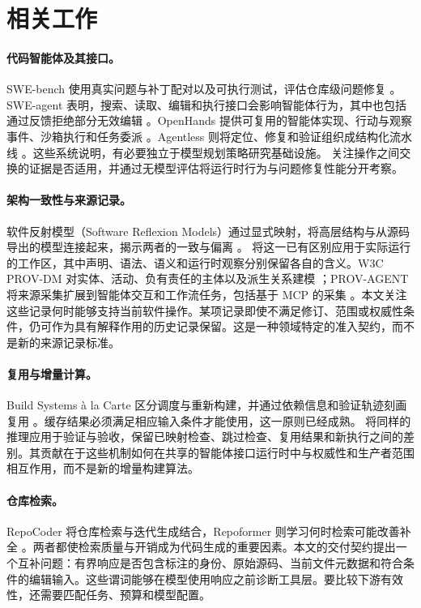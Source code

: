 \section{相关工作}
\label{sec:related}
\paragraph{代码智能体及其接口。}
SWE-bench 使用真实问题与补丁配对以及可执行测试，评估仓库级问题修复 \cite{jimenez2024swebench}。SWE-agent 表明，搜索、读取、编辑和执行接口会影响智能体行为，其中也包括通过反馈拒绝部分无效编辑 \cite{yang2024sweagent}。OpenHands 提供可复用的智能体实现、行动与观察事件、沙箱执行和任务委派 \cite{wang2025openhands}。Agentless 则将定位、修复和验证组织成结构化流水线 \cite{xia2025agentless}。这些系统说明，有必要独立于模型规划策略研究基础设施。\wcode{} 关注操作之间交换的证据是否适用，并通过无模型评估将运行时行为与问题修复性能分开考察。

\paragraph{架构一致性与来源记录。}
软件反射模型（Software Reflexion Models）通过显式映射，将高层结构与从源码导出的模型连接起来，揭示两者的一致与偏离 \cite{murphy1995reflexion}。\wcode{} 将这一已有区别应用于实际运行的工作区，其中声明、语法、语义和运行时观察分别保留各自的含义。W3C PROV-DM 对实体、活动、负有责任的主体以及派生关系建模 \cite{w3c2013provdm}；PROV-AGENT 将来源采集扩展到智能体交互和工作流任务，包括基于 MCP 的采集 \cite{souza2025provagent}。本文关注这些记录何时能够支持当前软件操作。某项记录即使不满足修订、范围或权威性条件，仍可作为具有解释作用的历史记录保留。这是一种领域特定的准入契约，而不是新的来源记录标准。

\paragraph{复用与增量计算。}
Build Systems \`a la Carte 区分调度与重新构建，并通过依赖信息和验证轨迹刻画复用 \cite{mokhov2018buildsystems}。缓存结果必须满足相应输入条件才能使用，这一原则已经成熟。\wcode{} 将同样的推理应用于验证与验收，保留已映射检查、跳过检查、复用结果和新执行之间的差别。其贡献在于这些机制如何在共享的智能体接口运行时中与权威性和生产者范围相互作用，而不是新的增量构建算法。

\paragraph{仓库检索。}
RepoCoder 将仓库检索与迭代生成结合，Repoformer 则学习何时检索可能改善补全 \cite{zhang2023repocoder,wu2024repoformer}。两者都使检索质量与开销成为代码生成的重要因素。本文的交付契约提出一个互补问题：有界响应是否包含标注的身份、原始源码、当前文件元数据和符合条件的编辑输入。这些谓词能够在模型使用响应之前诊断工具层。要比较下游有效性，还需要匹配任务、预算和模型配置。


